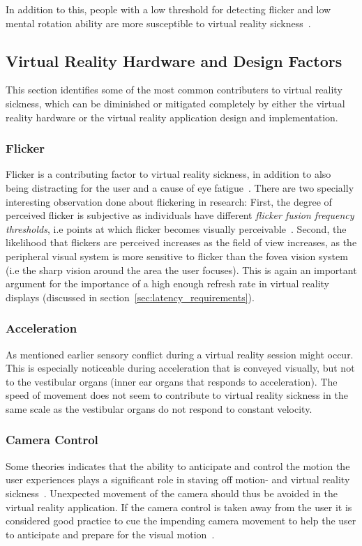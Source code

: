 In addition to this, people with a low threshold for detecting flicker and low mental rotation ability are more susceptible to virtual reality sickness~\cite{Kolasinski1995}.

\subsection{Virtual Reality Hardware and Design Factors}
This section identifies some of the most common contributers to virtual reality sickness, which can be diminished or mitigated completely by either the virtual reality hardware
or the virtual reality application design and implementation. 

\subsubsection{Flicker}
Flicker is a contributing factor to virtual reality sickness, in addition to also being distracting for the user and a cause of eye fatigue~\citep{Jr2000}.
There are two specially interesting observation done about flickering in research: First, the degree of perceived flicker is subjective as 
individuals have different \textit{flicker fusion frequency thresholds}, i.e points at which flicker becomes visually perceivable~\citep{Pausch1992}.
Second, the likelihood that flickers are perceived increases as the field of view increases, as the peripheral visual system is more sensitive to flicker than 
the fovea vision system (i.e the sharp vision around the area the user focuses). This is again an important argument for the importance of a high enough
refresh rate in virtual reality displays (discussed in section~\vref{sec:latency_requirements}). 

\subsubsection{Acceleration}
As mentioned earlier sensory conflict during a virtual reality session might occur. This is especially noticeable during acceleration that is conveyed visually, but 
not to the vestibular organs (inner ear organs that responds to acceleration). The speed of movement does not seem to contribute to virtual reality sickness in the same scale
as the vestibular organs do not respond to constant velocity. %

\subsubsection{Camera Control}
\label{sec:camera_control}
Some theories indicates that the ability to anticipate and control the motion the user experiences plays a significant role in staving off motion- 
and virtual reality sickness~\citep{Rolnick1991}. Unexpected movement of the camera should thus be avoided in the virtual reality application. 
If the camera control is taken away from the user it is considered good practice to cue the impending camera movement to help the user to anticipate and prepare for 
the visual motion~\citep{Lin2004}.

